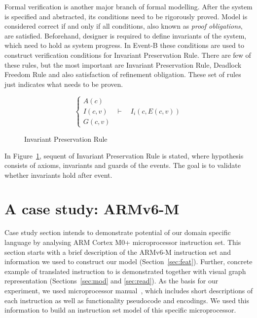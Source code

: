 \documentclass[conference]{IEEEtran}
\begin{document}
Formal verification is another major branch of formal modelling. After the system is
specified and abstracted, its conditions need to be rigorously proved. Model is considered
correct if and only if all conditions, also known as \textit{proof obligations}, are
satisfied. Beforehand, designer is required to define invariants of the system, which need to
hold as system progress. In Event-B these conditions are used to construct verification
conditions for Invariant Preservation Rule. There are few of these rules, but the most
important are Invariant Preservation Rule, Deadlock Freedom Rule and also satisfaction of
refinement obligation. These set of rules just indicates what needs to be proven.

\begin{figure}[ht!]
\begin{center}
	$$\begin{cases}
	A(c)\\
	I(c, v) & \vdash \quad I_i(c, E(c,v))\\
	G(c, v)
  \end{cases}$$
	\caption{Invariant Preservation Rule}
	\label{fig:eveB}
\end{center}
\end{figure}

In Figure~\ref{fig:eveB}, sequent of Invariant Preservation Rule is stated, where hypothesis
consists of axioms, invariants and guards of the events. The goal is to validate whether
invariants hold after event.


\section{A case study: ARMv6-M}
\label{sec:arm}

Case study section intends to demonstrate potential of our domain specific language by
analysing ARM Cortex M0+ microprocessor instruction set. This section starts with a brief
description of the ARMv6-M instruction set and information we used to construct our model
(Section~\ref{sec:feat}). Further, concrete example of translated instruction to is
demonstrated together with visual graph representation (Sections~\ref{sec:mod} and
\ref{sec:read}). As the basis for our experiment, we used microprocessor
manual~\cite{armManual}, which includes short descriptions of each instruction as well as
functionality pseudocode and encodings. We used this information to build an instruction set
model of this specific microprocessor. 
\end{document}
